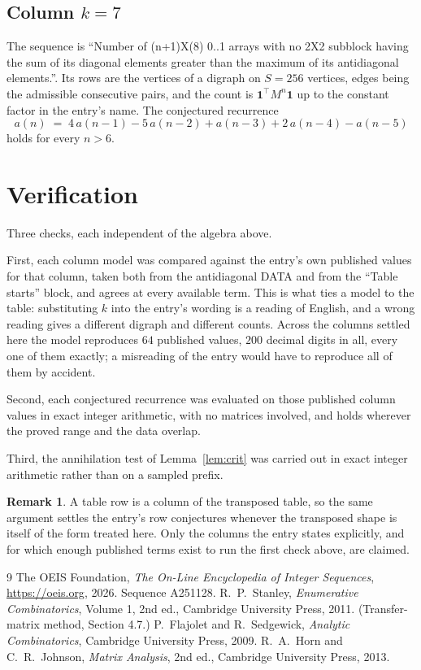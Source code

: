 \documentclass[11pt,a4paper]{article}
\theoremstyle{plain}
\theoremstyle{definition}
\newtheorem{remark}[theorem]{Remark}
\begin{document}
\subsection*{Column $k=7$}
The sequence is ``Number of (n+1)X(8) 0..1 arrays with no 2X2 subblock having the sum of its diagonal elements greater than the maximum of its antidiagonal elements.''. Its rows are the vertices of a digraph on
$S=256$ vertices, edges being the admissible consecutive pairs, and the count is
$\mathbf{1}^{\!\top}M^{n}\mathbf{1}$ up to the constant factor in the entry's name.
The conjectured recurrence
\[
a(n)\;=\;4\,a(n-1) - 5\,a(n-2) + a(n-3) + 2\,a(n-4) - a(n-5)
\]
holds for every $n>6$.

\section{Verification}

Three checks, each independent of the algebra above.

First, each column model was compared against the entry's own published values for that
column, taken both from the antidiagonal DATA and from the ``Table starts'' block, and agrees
at every available term. This is what ties a model to the table: substituting $k$ into the
entry's wording is a reading of English, and a wrong reading gives a different digraph and
different counts. Across the columns settled here the model reproduces $64$ published
values, $200$ decimal digits in all, every one of them exactly; a misreading of the entry
would have to reproduce all of them by accident.

Second, each conjectured recurrence was evaluated on those published column values in exact
integer arithmetic, with no matrices involved, and holds wherever the proved range and the
data overlap.

Third, the annihilation test of Lemma~\ref{lem:crit} was carried out in exact integer
arithmetic rather than on a sampled prefix.

\begin{remark}
A table row is a column of the transposed table, so the same argument settles the entry's row
conjectures whenever the transposed shape is itself of the form treated here. Only the columns
the entry states explicitly, and for which enough published terms exist to run the first check
above, are claimed.
\end{remark}

\begin{thebibliography}{9}
 The OEIS Foundation, \emph{The On-Line Encyclopedia of Integer
Sequences}, \url{https://oeis.org}, 2026. Sequence A251128.
 R.~P.~Stanley, \emph{Enumerative Combinatorics}, Volume 1, 2nd ed.,
Cambridge University Press, 2011. (Transfer-matrix method, Section 4.7.)
 P.~Flajolet and R.~Sedgewick, \emph{Analytic Combinatorics}, Cambridge
University Press, 2009.
 R.~A.~Horn and C.~R.~Johnson, \emph{Matrix Analysis}, 2nd ed., Cambridge
University Press, 2013.
\end{thebibliography}
\end{document}

